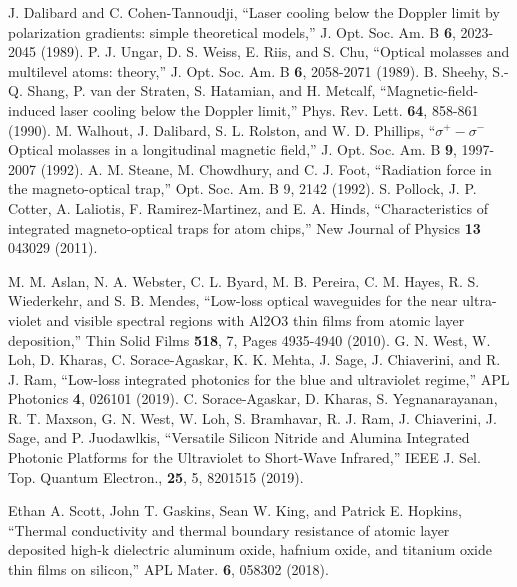 \documentclass{osa-article}
\begin{document}
\begin{thebibliography}{99}
 J. Dalibard and C. Cohen-Tannoudji, ``Laser cooling below the Doppler limit by polarization gradients: simple theoretical models,'' J. Opt. Soc. Am. B \textbf{6}, 2023-2045 (1989).
 P. J. Ungar, D. S. Weiss, E. Riis, and S. Chu, {} ``Optical molasses and multilevel atoms: theory,'' J. Opt. Soc. Am. B \textbf{6}, 2058-2071 (1989).
 B. Sheehy, S.-Q. Shang, P. van der Straten, S. Hatamian, and H. Metcalf, {} ``Magnetic-field-induced laser cooling below the Doppler limit,'' Phys. Rev. Lett. \textbf{64}, 858-861 (1990).
 M. Walhout, J. Dalibard, S. L. Rolston, and W. D. Phillips, {} ``$\sigma^{+}-\sigma^{-}$ Optical molasses in a longitudinal magnetic field,'' J. Opt. Soc. Am. B \textbf{9}, 1997-2007 (1992).
 A. M. Steane, M. Chowdhury, and C. J. Foot, {} ``Radiation force in the magneto-optical trap,'' Opt. Soc. Am. B 9, 2142 (1992).
 S. Pollock, J. P. Cotter, A. Laliotis, F. Ramirez-Martinez, and E. A. Hinds, {} ``Characteristics of integrated magneto-optical traps for atom chips,'' New Journal of Physics \textbf{13} 043029 (2011).

 M. M. Aslan, N. A. Webster, C. L. Byard, M. B. Pereira, C. M. Hayes, R. S. Wiederkehr, and S. B. Mendes, {} ``Low-loss optical waveguides for the near ultra-violet and visible spectral regions with Al2O3 thin films from atomic layer deposition,'' Thin Solid Films \textbf{518}, 7, Pages 4935-4940 (2010).
 G. N. West, W. Loh, D. Kharas, C. Sorace-Agaskar, K. K. Mehta, J. Sage, J. Chiaverini, and R. J. Ram, {} ``Low-loss integrated photonics for the blue and ultraviolet regime,'' APL Photonics \textbf{4}, 026101 (2019).
 C. Sorace-Agaskar, D. Kharas, S. Yegnanarayanan, R. T. Maxson, G. N. West, W. Loh, S. Bramhavar, R. J. Ram, J. Chiaverini, J. Sage, and P. Juodawlkis, {} ``Versatile Silicon Nitride and Alumina Integrated Photonic Platforms for the Ultraviolet to Short-Wave Infrared,'' IEEE J. Sel. Top. Quantum Electron., \textbf{25}, 5, 8201515 (2019).

 Ethan A. Scott, John T. Gaskins, Sean W. King, and Patrick E. Hopkins, {} ``Thermal conductivity and thermal boundary resistance of atomic layer deposited high-k dielectric aluminum oxide, hafnium oxide, and titanium oxide thin films on silicon,'' APL Mater. \textbf{6}, 058302 (2018).


\end{thebibliography}
\end{document}
